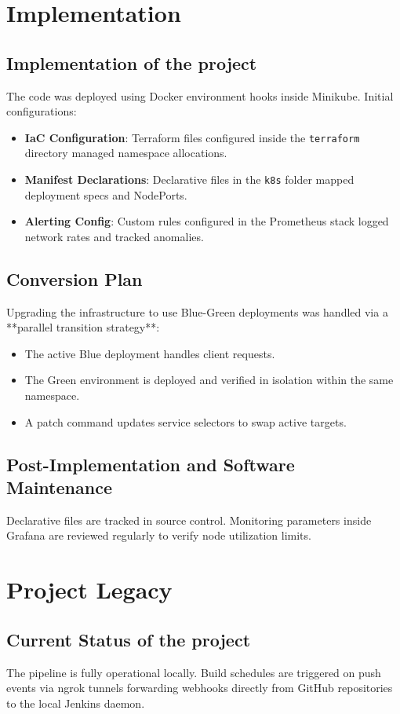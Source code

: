 \documentclass[12pt,a4paper]{article}
\begin{document}
\section{Implementation}
\subsection{Implementation of the project}
The code was deployed using Docker environment hooks inside Minikube. Initial configurations:
\begin{itemize}
    \item \textbf{IaC Configuration}: Terraform files configured inside the \texttt{terraform} directory managed namespace allocations.
    \item \textbf{Manifest Declarations}: Declarative files in the \texttt{k8s} folder mapped deployment specs and NodePorts.
    \item \textbf{Alerting Config}: Custom rules configured in the Prometheus stack logged network rates and tracked anomalies.
\end{itemize}

\subsection{Conversion Plan}
Upgrading the infrastructure to use Blue-Green deployments was handled via a **parallel transition strategy**:
\begin{itemize}
    \item The active Blue deployment handles client requests.
    \item The Green environment is deployed and verified in isolation within the same namespace.
    \item A patch command updates service selectors to swap active targets.
\end{itemize}

\subsection{Post-Implementation and Software Maintenance}
Declarative files are tracked in source control. Monitoring parameters inside Grafana are reviewed regularly to verify node utilization limits.

\section{Project Legacy}
\subsection{Current Status of the project}
The pipeline is fully operational locally. Build schedules are triggered on push events via ngrok tunnels forwarding webhooks directly from GitHub repositories to the local Jenkins daemon.
\end{document}
